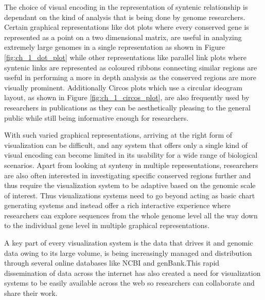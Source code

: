 The choice of visual encoding in the representation of syntenic relationship is dependant on the kind of analysis that is being done by genome researchers. Certain graphical representations like dot plots where every conserved gene is represented as a point on a two dimensional matrix, are useful in analyzing extremely large genomes in a single representation as shown in Figure \ref{fig:ch_1_dot_plot} while other representations like parallel link plots where syntenic links are represented as coloured ribbons connecting similar regions are useful in performing a more in depth analysis as the conserved regions are more visually prominent. Additionally Circos plots which use a circular ideogram layout, as shown in Figure \ref{fig:ch_1_circos_plot}, are also frequently used by researchers in publications as they can be aesthetically pleasing to the general public while still being informative enough for researchers.

With such varied graphical representations, arriving at the right form of visualization can be difficult, and any system that offers only a single kind of visual encoding can become limited in its usability for a wide range of biological scenarios. Apart from looking at synteny in multiple representations, researchers are also often interested in  investigating specific conserved regions further and thus require the visualization system to be adaptive based on the genomic scale of interest. Thus visualizations systems need to go beyond acting as basic chart generating systems and instead offer a rich interactive experience where researchers can explore sequences from the whole genome level all the way down to the individual gene level in multiple graphical representations.

A key part of every visualization system is the data that drives it and genomic data owing to its large volume, is being increasingly managed and distribution through several online databases like NCBI and genBank.This rapid dissemination of data across the internet has also created a need for visualization systems to be easily available across the web so researchers can collaborate and share their work.


